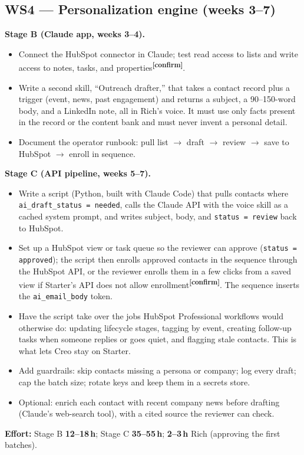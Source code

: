 \documentclass[11pt]{article}
\newcommand{\hrs}[1]{\textbf{#1\,h}}
\newcommand{\verify}{\textcolor{orange!80!black}{\textsuperscript{\textbf{[confirm]}}}}
\begin{document}
\subsection{WS4 --- Personalization engine (weeks 3--7)}
\textbf{Stage B (Claude app, weeks 3--4).}
\begin{itemize}
  \item Connect the HubSpot connector in Claude; test read access to lists and write access to
  notes, tasks, and properties\verify.
  \item Write a second skill, ``Outreach drafter,'' that takes a contact record plus a trigger
  (event, news, past engagement) and returns a subject, a 90--150-word body, and a LinkedIn
  note, all in Rich's voice. It must use only facts present in the record or the content bank
  and must never invent a personal detail.
  \item Document the operator runbook: pull list $\rightarrow$ draft $\rightarrow$ review
  $\rightarrow$ save to HubSpot $\rightarrow$ enroll in sequence.
\end{itemize}
\textbf{Stage C (API pipeline, weeks 5--7).}
\begin{itemize}
  \item Write a script (Python, built with Claude Code) that pulls contacts where
  \texttt{ai\_draft\_status = needed}, calls the Claude API with the voice skill as a cached
  system prompt, and writes subject, body, and \texttt{status = review} back to HubSpot.
  \item Set up a HubSpot view or task queue so the reviewer can approve
  (\texttt{status = approved}); the script then enrolls approved contacts in the sequence
  through the HubSpot API, or the reviewer enrolls them in a few clicks from a saved view if
  Starter's API does not allow enrollment\verify. The sequence inserts the
  \texttt{ai\_email\_body} token.
  \item Have the script take over the jobs HubSpot Professional workflows would otherwise do:
  updating lifecycle stages, tagging by event, creating follow-up tasks when someone replies or
  goes quiet, and flagging stale contacts. This is what lets Creo stay on Starter.
  \item Add guardrails: skip contacts missing a persona or company; log every draft; cap the
  batch size; rotate keys and keep them in a secrets store.
  \item Optional: enrich each contact with recent company news before drafting (Claude's
  web-search tool), with a cited source the reviewer can check.
\end{itemize}
\textbf{Effort:} Stage B \hrs{12--18}; Stage C \hrs{35--55}; \hrs{2--3} Rich (approving the first
batches).
\end{document}
